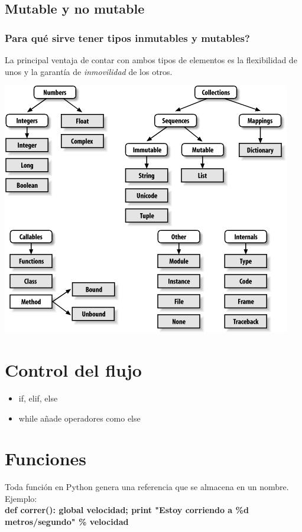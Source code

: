 \documentclass{beamer}
\begin{document}
\subsection{Mutable y no mutable}
\begin{frame}
\frametitle{Para qué sirve tener tipos inmutables y mutables?}
La principal ventaja de contar con ambos tipos de elementos es la flexibilidad de unos y la garantía de \textit{inmovilidad} de los otros.
\begin{center}
\includegraphics[height=0.7\textheight]{tree.png}
\end{center}
\end{frame}

\section{Control del flujo}
\begin{frame}
\begin{itemize}
\item if, elif, else
\item while
	añade operadores como else
\end{itemize}
\end{frame}

\section{Funciones}
\begin{frame}
Toda función en Python genera una referencia que se almacena en un nombre. Ejemplo:\\
\textbf{def correr(): global velocidad; print "Estoy corriendo a \%d metros/segundo" \% velocidad}
\end{frame}
\end{document}
